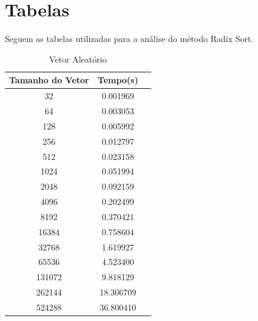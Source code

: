 \documentclass[12pt,a4paper,twoside]{report}
\begin{document}
\chapter{Tabelas}

Seguem as tabelas utilizadas para a análise do método Radix Sort.

\begin{table}[h]
  \centering
  \caption{Vetor Aleatório \label{tab:aleatorio}}
  \begin{tabular}{ccc} \\\hline
  \textbf{Tamanho do Vetor}  & \textbf{Tempo(s)} \\\hline
  32                                   & 0.001969         \\\hline
  64                                   & 0.003053          \\\hline
  128                                  & 0.005992         \\\hline
  256                                  & 0.012797          \\\hline
  512                                  & 0.023158          \\\hline
  1024                                 & 0.051994          \\\hline
  2048                                 & 0.092159          \\\hline
  4096                                 & 0.202499         \\\hline
  8192                                 & 0.370421        \\\hline
  16384                                & 0.758604        \\\hline
  32768                                & 1.619927        \\\hline
  65536                                & 4.523400        \\\hline
  131072                               & 9.818129        \\\hline
  262144                               & 18.306709        \\\hline
  524288                               & 36.800410        \\\hline
  \end{tabular}
\end{table}
\end{document}
